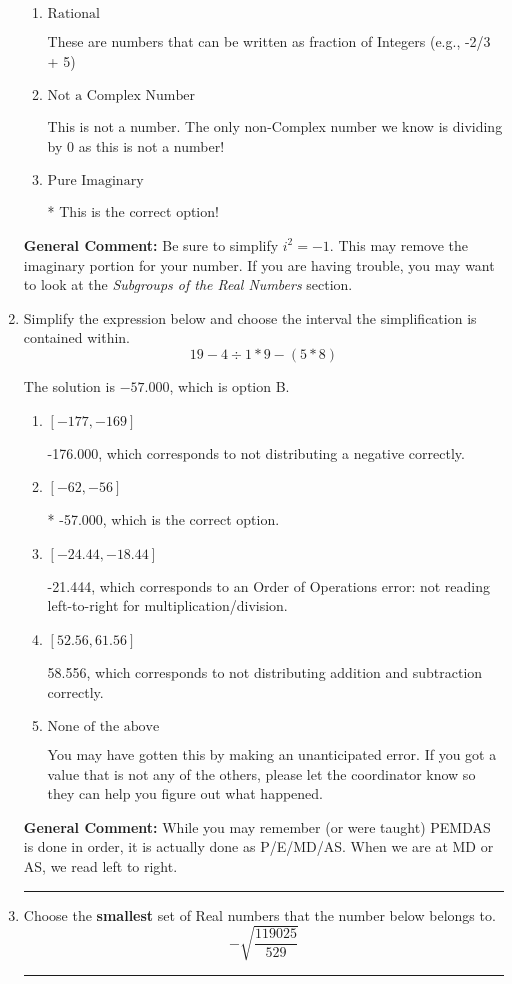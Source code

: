 \documentclass{extbook}[14pt]
\newcommand{\litem}[1]{\item #1

\rule{\textwidth}{0.4pt}}
\begin{document}
\begin{enumerate}
{\begin{enumerate}[label=\Alph*.]
This is a Complex number $(a+bi)$ that is not Real (has $i$ as part of the number).
\item \( \text{Rational} \)

These are numbers that can be written as fraction of Integers (e.g., -2/3 + 5)
\item \( \text{Not a Complex Number} \)

This is not a number. The only non-Complex number we know is dividing by 0 as this is not a number!
\item \( \text{Pure Imaginary} \)

* This is the correct option!
\end{enumerate}

\textbf{General Comment:} Be sure to simplify $i^2 = -1$. This may remove the imaginary portion for your number. If you are having trouble, you may want to look at the \textit{Subgroups of the Real Numbers} section.
}
\litem{
Simplify the expression below and choose the interval the simplification is contained within.
\[ 19 - 4 \div 1 * 9 - (5 * 8) \]

The solution is \( -57.000 \), which is option B.\begin{enumerate}[label=\Alph*.]
\item \( [-177, -169] \)

 -176.000, which corresponds to not distributing a negative correctly.
\item \( [-62, -56] \)

* -57.000, which is the correct option.
\item \( [-24.44, -18.44] \)

 -21.444, which corresponds to an Order of Operations error: not reading left-to-right for multiplication/division.
\item \( [52.56, 61.56] \)

 58.556, which corresponds to not distributing addition and subtraction correctly.
\item \( \text{None of the above} \)

 You may have gotten this by making an unanticipated error. If you got a value that is not any of the others, please let the coordinator know so they can help you figure out what happened.
\end{enumerate}

\textbf{General Comment:} While you may remember (or were taught) PEMDAS is done in order, it is actually done as P/E/MD/AS. When we are at MD or AS, we read left to right.
}
\litem{
Choose the \textbf{smallest} set of Real numbers that the number below belongs to.
\[ -\sqrt{\frac{119025}{529}} \]

}
\end{enumerate}
\end{document}
